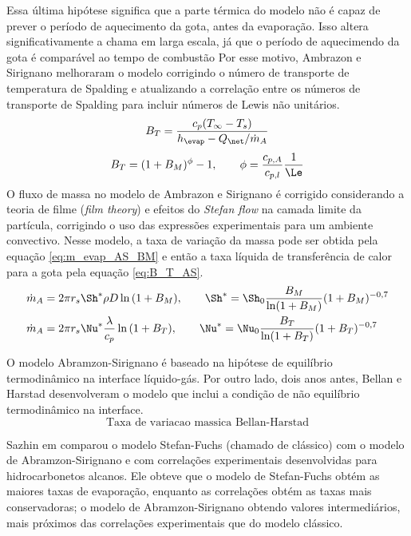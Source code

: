 Essa última hipótese significa que a parte térmica do modelo não é capaz de prever o período de aquecimento da gota, antes da evaporação.
Isso altera significativamente a chama em larga escala, já que o período de aquecimendo da gota é comparável ao tempo de combustão  
Por esse motivo, Ambrazon e Sirignano \cite{Sirignano1989} melhoraram o modelo corrigindo o número de transporte de temperatura de Spalding
e atualizando a correlação entre os números de transporte de Spalding para incluir números de Lewis não unitários.
\begin{equation}
    B_T = \frac{c_p (T_\infty - T_s)}{h_\evap - Q_{\net}/\dot m_A} \label{eq:B_T_AS}
\end{equation}
\begin{equation}
    B_T = (1 + B_M)^\phi - 1,
    \qquad
    \phi=\frac{c_{p,A}}{c_{p,l}}\frac{1}{\Le}
    \label{eq:B_M_B_T}
\end{equation}
O fluxo de massa no modelo de Ambrazon e Sirignano é corrigido considerando a teoria de filme (\emph{film theory}) e efeitos do \emph{Stefan flow} na camada limite da partícula, corrigindo o uso das expressões experimentais para um ambiente convectivo.
Nesse modelo, a taxa de variação da massa pode ser obtida pela equação \eqref{eq:m_evap_AS_BM} e então a taxa líquida de transferência de calor para a gota pela equação \eqref{eq:B_T_AS}.
\begin{align}
\dot m_{A} &= 2 \pi r_s \Sh^* \rho D \ln{(1 + B_M)}              
,\qquad
\Sh^* = \Sh_0 \frac{B_M}{\ln (1 + B_M)} (1 + B_M)^{-0,7} \label{eq:m_evap_AS_BM}
\\
\dot m_A   &= 2 \pi r_s \Nu^* \frac{\lambda}{c_p} \ln{(1 + B_T)} 
,\qquad
\Nu^* = \Nu_0 \frac{B_T}{\ln (1 + B_T)} (1 + B_T)^{-0,7} \label{eq:m_evap_AS_BT}
\end{align}

O modelo Abramzon-Sirignano é baseado na hipótese de equilíbrio termodinâmico na interface líquido-gás.
Por outro lado, dois anos antes, Bellan e Harstad  desenvolveram o modelo que inclui a condição de não equilíbrio termodinâmico na interface.
\begin{equation}
    \text{Taxa de variacao massica Bellan-Harstad}
\end{equation}


Sazhin em \cite{Sazhin2006} comparou o modelo Stefan-Fuchs (chamado de clássico) com o modelo de Abramzon-Sirignano e com correlações experimentais desenvolvidas para hidrocarbonetos alcanos.
Ele obteve que o modelo de Stefan-Fuchs obtém as maiores taxas de evaporação, enquanto as correlações obtém as taxas mais conservadoras; o modelo de Abramzon-Sirignano obtendo valores intermediários, mais próximos das correlações experimentais que do modelo clássico.

